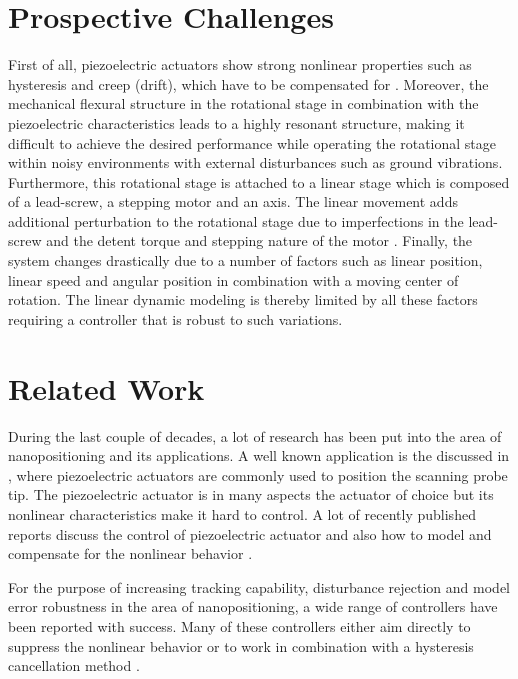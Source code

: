 \newpage
\section{Prospective Challenges}\label{sec:prospectiveChallanges}
First of all, piezoelectric actuators show strong nonlinear properties such as hysteresis and creep (drift), which have to be compensated for \citep{Piezo:2008}. Moreover, the mechanical flexural structure in the rotational stage in combination with the piezoelectric characteristics leads to a highly resonant structure, making it difficult to achieve the desired performance while operating the rotational stage within noisy environments with external disturbances such as ground vibrations. Furthermore, this rotational stage is attached to a linear stage which is composed of a lead-screw, a stepping motor and an axis. The linear movement adds additional perturbation to the rotational stage due to imperfections in the lead-screw and the detent torque and stepping nature of the motor \citep{ButcherController:2015}. Finally, the system changes drastically due to a number of factors such as linear position, linear speed and angular position in combination with a moving center of rotation. The linear dynamic modeling is thereby limited by all these factors requiring a controller that is robust to such variations.

\section{Related Work}
During the last couple of decades, a lot of research has been put into the area of nanopositioning and its applications. A well known application is the \abbrAFM discussed in \citep{chuang2013robust, SurveyOfControlIssues:2007}, where piezoelectric actuators are commonly used to position the scanning probe tip. The piezoelectric actuator is in many aspects the actuator of choice but its nonlinear characteristics make it hard to control. A lot of recently published reports discuss the control of piezoelectric actuator \citep{gu2013motion, gu2016modeling} and also how to model and compensate for the nonlinear behavior \citep{Biggio:2014,ButcherIdentification:2015,Maxwell:2012,leang2002hysteresis}.

For the purpose of increasing tracking capability, disturbance rejection and model error robustness in the area of nanopositioning, a wide range of controllers have been reported with success. Many of these controllers either aim directly to suppress the nonlinear behavior \citep{Elmali:1996,ompc, xu2014model} or to work in combination with a hysteresis cancellation method \citep{gu:2014, inputshaper}.

